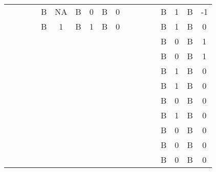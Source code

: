 \documentclass{jote-article}
\begin{document}
\begin{table}
\begin{tabular}{c  c  c  c  c  c  c  c  c  c  c  c  c  c  c  c  c  c}
 &  &  &  & B & NA & B & 0 & B & 0 &  &  &  &  & B & 1 & B & -1 & \\
 &  &  &  & B & 1 & B & 1 & B & 0 &  &  &  &  & B & 1 & B & 0 & \\
 &  &  &  &  &  &  &  &  &  &  &  &  &  & B & 0 & B & 1 & \\
 &  &  &  &  &  &  &  &  &  &  &  &  &  & B & 0 & B & 1 & \\
 &  &  &  &  &  &  &  &  &  &  &  &  &  & B & 1 & B & 0 & \\
 &  &  &  &  &  &  &  &  &  &  &  &  &  & B & 1 & B & 0 & \\
 &  &  &  &  &  &  &  &  &  &  &  &  &  & B & 0 & B & 0 & \\
 &  &  &  &  &  &  &  &  &  &  &  &  &  & B & 1 & B & 0 & \\
 &  &  &  &  &  &  &  &  &  &  &  &  &  & B & 0 & B & 0 & \\
 &  &  &  &  &  &  &  &  &  &  &  &  &  & B & 0 & B & 0 & \\
 &  &  &  &  &  &  &  &  &  &  &  &  &  & B & 0 & B & 0 & \\


\end{tabular}


\end{table}
\end{document}
